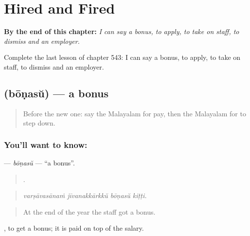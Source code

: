 
\chapter{Hired and Fired}
\label{ch:ml-hired-and-fired}

\begin{chapteropening}
\textbf{By the end of this chapter:} \emph{I can say a bonus, to apply, to take on staff, to dismiss and an employer.}

Complete the last lesson of chapter 543: I can say a bonus, to apply, to take on staff, to dismiss and an employer.
\end{chapteropening}

\section[\texorpdfstring{\ml{ബോണസ്} (bōṇasŭ)}{ബോണസ് (bōṇasŭ)}]{ (bōṇasŭ) — a bonus}

\label{lesson:ML-C543-bonasu}



\begin{quote}
Before the new one: say the Malayalam for pay, then the Malayalam for to step down.
\end{quote}

\subsection*{You'll want to know: }
\textbf{} — \emph{bōṇasŭ} — \textquotedblleft{}a bonus\textquotedblright{}.

\begin{quote}
   .
\end{quote}

\begin{quote}
\emph{varṣāvasānaṁ jīvanakkārkkŭ bōṇasŭ kiṭṭi.}
\end{quote}

\begin{quote}
At the end of the year the staff got a bonus.
\end{quote}

 , to get a bonus; it is paid on top of the salary.

